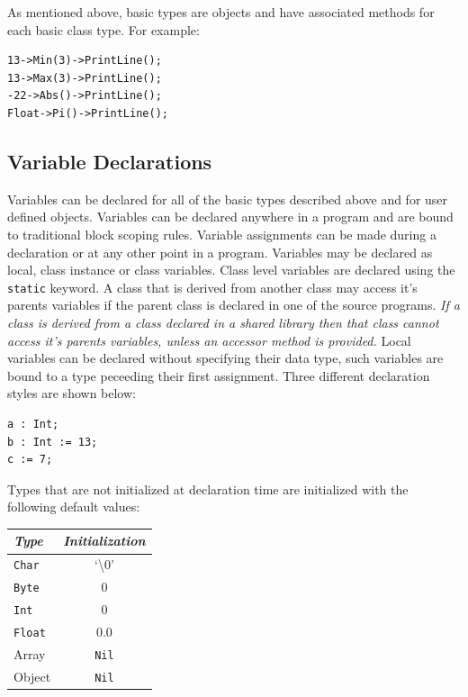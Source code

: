 \documentclass[12pt]{article}
\begin{document}
As mentioned above, basic types are objects and have associated methods for each basic class type.  For example:

\begin{verbatim}
13->Min(3)->PrintLine();
13->Max(3)->PrintLine();
-22->Abs()->PrintLine();
Float->Pi()->PrintLine();
\end{verbatim}

\subsection{Variable Declarations}
Variables can be declared for all of the basic types described above and for user defined objects. Variables can be declared anywhere in a program and are bound to traditional block scoping rules.  Variable assignments can be made during a declaration or at any other point in a program. Variables may be declared as local, class instance or class variables.  Class level variables are declared using the \texttt{static} keyword. A class that is derived from another class may access it's parents variables if the parent class is declared in one of the source programs.  \textit{If a class is derived from a class declared in a shared library then that class cannot access it's parents variables, unless an accessor method is provided.}  Local variables can be declared without specifying their data type, such variables are bound to a type peceeding their first assignment. Three different declaration styles are shown below:

\begin{verbatim}
a : Int;
b : Int := 13;
c := 7;
\end{verbatim}

Types that are not initialized at declaration time are initialized with the following default values:

\vspace{\baselineskip}
\begin{center}
\begin{tabular}{| l | c |}
\hline
\emph{Type} & \emph{Initialization} \\ \hline \hline
\texttt{Char} & `\textbackslash0' \\ \hline
\texttt{Byte} & 0 \\ \hline
\texttt{Int} & 0 \\ \hline
\texttt{Float} & 0.0 \\ \hline
Array & \texttt{Nil} \\ \hline
Object & \texttt{Nil} \\ \hline
\end{tabular}
\end{center}
\end{document}

